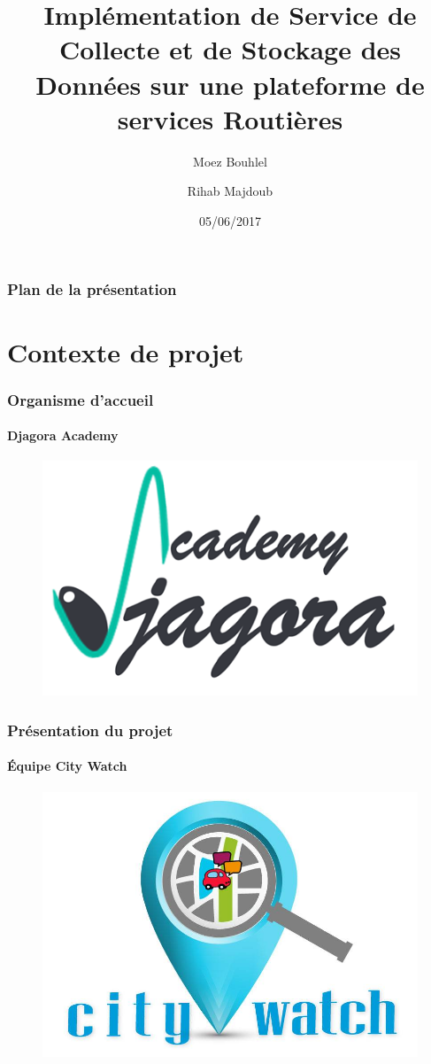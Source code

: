 \documentclass{beamer}
\title[Service Routière]{\textbf{Implémentation de Service de Collecte et de Stockage des Données sur une plateforme de services Routières}}
\author{Moez Bouhlel \and Rihab Majdoub}
\author[Moez B. \and Rihab M.]{\textbf {Moez Bouhlel \and Rihab Majdoub\\[0.2cm] \footnotesize Sous la direction de: \\ Dr. Mohamed Mhiri \and M. Mohamed Amri}}
\institute{Faculté des Sciences de Sfax}
\date{05/06/2017}
\begin{document}
{
    \frame{\titlepage}
}

\begin{frame}
    \frametitle{Plan de la présentation}
    \tableofcontents[hideallsubsections]
\end{frame}


\section{Contexte de projet}

\begin{frame}
    \frametitle{Organisme d'accueil}
    \framesubtitle{Djagora Academy}
    \begin{figure}
        \includegraphics[width=.7\textwidth]{figures/logo-djagora.png}
    \end{figure}
\end{frame}

\begin{frame}
    \frametitle{Présentation du projet}
    \framesubtitle{Équipe City Watch}
    \begin{figure}
        \includegraphics[width=.6\textwidth]{figures/logo-citywatch.jpg}
    \end{figure}
\end{frame}
\end{document}
